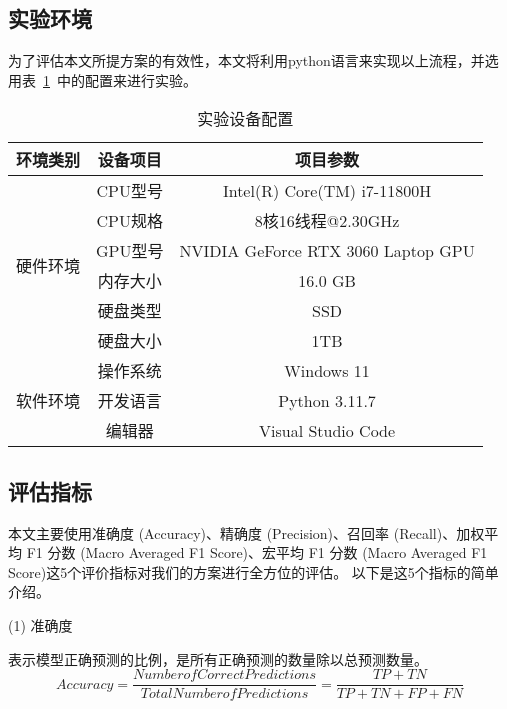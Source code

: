 \subsection{实验环境}
为了评估本文所提方案的有效性，本文将利用python语言来实现以上流程，并选用表~\ref{tab:env_setting}~中的配置来进行实验。

\begin{table}[htbp]
  \caption{实验设备配置}
  \label{tab:env_setting}
  \centering
  \begin{tabular}{ccc}
    \toprule
    \textbf{环境类别} & \textbf{设备项目} & \textbf{项目参数}\\
    \midrule
    \multirow{6}{*}{硬件环境}& CPU型号 & Intel(R) Core(TM) i7-11800H\\
                            & CPU规格 & 8核16线程@2.30GHz\\
                            & GPU型号 & NVIDIA GeForce RTX 3060 Laptop GPU\\
                            & 内存大小& 16.0 GB\\
                            & 硬盘类型& SSD\\
                            & 硬盘大小& 1TB\\
                            \hline
    \multirow{3}{*}{软件环境}&操作系统&Windows 11\\
                            &开发语言&Python 3.11.7\\
                            &编辑器 &Visual Studio Code\\                       
    \bottomrule
  \end{tabular}
\end{table}

\subsection{评估指标}
本文主要使用准确度 (Accuracy)、精确度 (Precision)、召回率 (Recall)、加权平均 F1 分数 (Macro Averaged F1 Score)、宏平均 F1 分数 (Macro Averaged F1 Score)这5个评价指标对我们的方案进行全方位的评估。
以下是这5个指标的简单介绍。\par
(1) 准确度\par
表示模型正确预测的比例，是所有正确预测的数量除以总预测数量。
\begin{equation}
  \label{eq:val_score1}
  Accuracy = \frac{Number of Correct Predictions}{Total Number of Predictions} = \frac{TP + TN}{TP + TN + FP + FN}
\end{equation}

